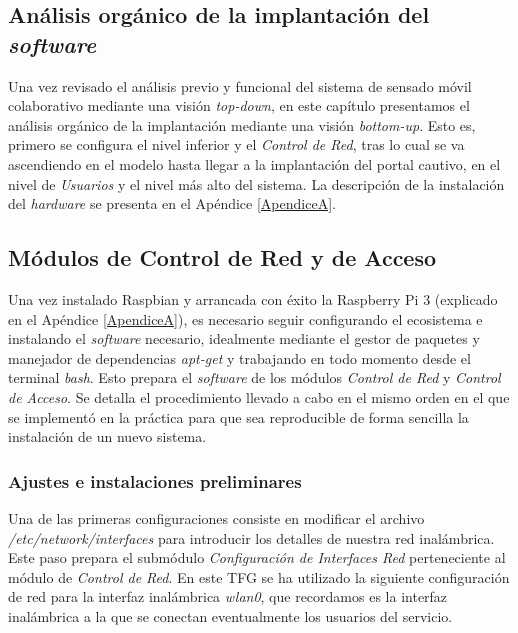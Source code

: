 \clearpage
{}
\begin{center}
\begin{minipage}{.75\textwidth}
\section{Análisis orgánico de la implantación del \emph{software}}

Una vez revisado el análisis previo y funcional del sistema de sensado móvil colaborativo mediante una visión \emph{top-down}, en este capítulo presentamos  el análisis orgánico de la implantación mediante una visión \emph{bottom-up}. Esto es, primero se configura el nivel inferior y el \emph{Control de Red}, tras lo cual se va ascendiendo en el modelo hasta llegar a la implantación del portal cautivo, en el nivel de \emph{Usuarios} y el nivel más alto del sistema. La descripción de la instalación del \emph{hardware} se presenta en el Apéndice \ref{ApendiceA}.
\end{minipage}
\end{center}
\clearpage%

\subsection{Módulos de Control de Red y de Acceso}
Una vez instalado Raspbian y arrancada con éxito la Raspberry Pi 3 (explicado en el Apéndice \ref{ApendiceA}), es necesario seguir configurando el ecosistema e instalando el \emph{software} necesario, idealmente mediante el gestor de paquetes y manejador de dependencias \emph{apt-get} y trabajando en todo momento desde el terminal \emph{bash}. Esto prepara el \emph{software} de los módulos \emph{Control de Red} y \emph{Control de Acceso}. Se detalla el procedimiento llevado a cabo en el mismo orden en el que se implementó en la práctica para que sea reproducible de forma sencilla la instalación de un nuevo sistema.

\subsubsection{Ajustes e instalaciones preliminares}
Una de las primeras configuraciones consiste en modificar el archivo \emph{/etc/network/interfaces} para introducir los detalles de nuestra red inalámbrica. Este paso prepara el submódulo \emph{Configuración de Interfaces Red} perteneciente al módulo de \emph{Control de Red}. En este TFG se ha utilizado la siguiente configuración de red para la interfaz inalámbrica \emph{wlan0}, que recordamos es la interfaz inalámbrica a la que se conectan eventualmente los usuarios del servicio.

